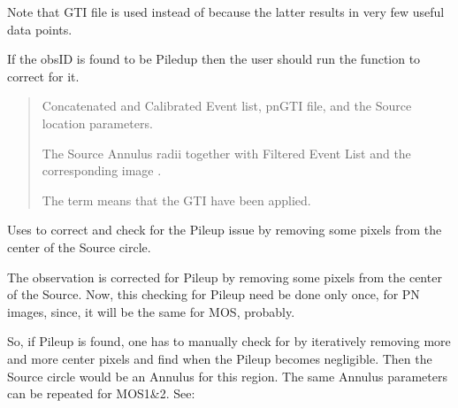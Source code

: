 \documentclass[letterpaper,10pt,english]{sphinxmanual}
\begin{document}
\begin{fulllineitems}
\begin{fulllineitems}
\sphinxAtStartPar
Note that  GTI file is used instead of 
because the latter results in very few useful data points.

\sphinxAtStartPar
If the obsID is found to be Piled\sphinxhyphen{}up then the user should run the 
function to correct for it.
\begin{quote}\begin{description}
\sphinxAtStartPar
Concatenated and Calibrated Event list, pnGTI file,
 and the Source location parameters.

\sphinxAtStartPar
The Source Annulus radii together with Filtered Event List
 and the corresponding image
.

\sphinxAtStartPar
The term  means that the GTI have been applied.

\end{description}\end{quote}

\end{fulllineitems}


\begin{fulllineitems}
\label{\detokenize{xmmPipeline:xmmPipeline.epicPileup.epicPileup.correctPileUp}}
\pysigstartsignatures
{}
\pysigstopsignatures
\sphinxAtStartPar
Uses  to correct and check for the Pile\sphinxhyphen{}up issue by removing
some pixels from the center of the Source circle.

\sphinxAtStartPar
The observation is corrected for Pile\sphinxhyphen{}up by removing some pixels from
the center of the Source. Now, this checking for Pile\sphinxhyphen{}up need be done
only once, for PN images, since, it will be the same for MOS, probably.

\sphinxAtStartPar
So, if Pile\sphinxhyphen{}up is found, one has to manually check for by iteratively
removing more and more center pixels and find when the Pile\sphinxhyphen{}up becomes
negligible. Then the Source circle would be an Annulus for this region.
The same Annulus parameters can be repeated for MOS1\&2.
See: 


\end{fulllineitems}
\end{fulllineitems}
\end{document}

